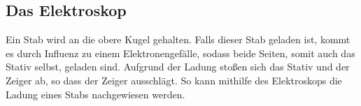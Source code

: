 \documentclass{article}
\begin{document}
\subsection{Das Elektroskop} 
\begin{minipage}{\dimexpr\linewidth-5cm}
 Ein Stab wird an die obere Kugel gehalten. Falls dieser Stab geladen ist, kommt es durch Influenz zu einem Elektronengefälle, sodass beide Seiten, somit auch das Stativ selbst, geladen sind. Aufgrund der Ladung stoßen sich das Stativ und der Zeiger ab, so dass der Zeiger ausschlägt. So kann mithilfe des Elektroskops die Ladung eines Stabs nachgewiesen werden.
\end{minipage}
\hfill 
\begin{minipage}{5cm}
 \centering
\end{minipage}
 
 
\end{document}
